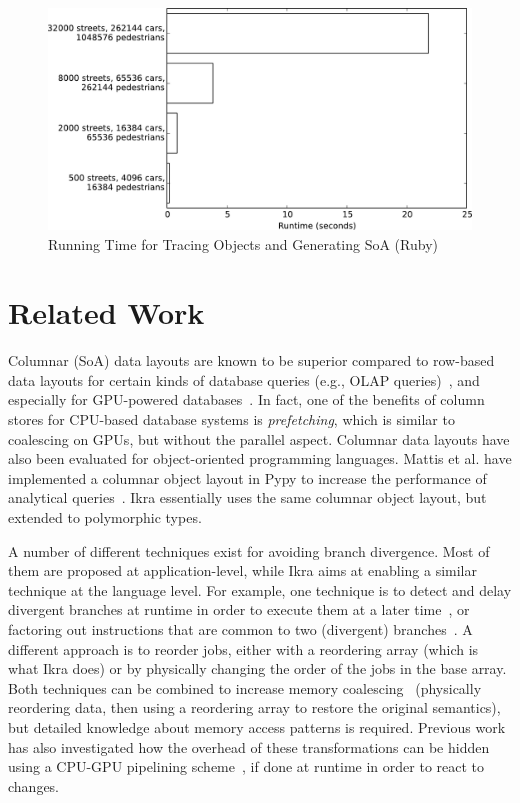 \documentclass[preprint]{sigplanconf}
\begin{document}
\begin{figure}[!htp]
    \includegraphics[width=\columnwidth]{obj_tracer.pdf}
    \centering
    \caption{Running Time for Tracing Objects and Generating SoA (Ruby)}
    \label{fig:tracing}
\end{figure}

\section{Related Work}
Columnar (SoA) data layouts are known to be superior compared to row-based data layouts for certain kinds of database queries (e.g., OLAP queries)~\cite{Plattner:2009:CDA:1559845.1559846}, and especially for GPU-powered databases~\cite{Bakkum:2010:ASD:1735688.1735706}. In fact, one of the benefits of column stores for CPU-based database systems is \emph{prefetching}, which is similar to coalescing on GPUs, but without the parallel aspect. Columnar data layouts have also been evaluated for object-oriented programming languages. Mattis et al. have implemented a columnar object layout in Pypy to increase the performance of analytical queries~\cite{Mattis:2015:COI:2814228.2814230}. Ikra essentially uses the same columnar object layout, but extended to polymorphic types.

A number of different techniques exist for avoiding branch divergence. Most of them are proposed at application-level, while Ikra aims at enabling a similar technique at the language level. For example, one technique is to detect and delay divergent branches at runtime in order to execute them at a later time~\cite{88d22b7f17}, or factoring out instructions that are common to two (divergent) branches~\cite{Han:2011:RBD:1964179.1964184}. A different approach is to reorder jobs, either with a reordering array (which is what Ikra does) or by physically changing the order of the jobs in the base array. Both techniques can be combined to increase memory coalescing~\cite{Zhang:2011:OED:1950365.1950408} (physically reordering data, then using a reordering array to restore the original semantics), but detailed knowledge about memory access patterns is required. Previous work has also investigated how the overhead of these transformations can be hidden using a CPU-GPU pipelining scheme~\cite{Zhang:2010:SGA:1810085.1810104}, if done at runtime in order to react to changes.
\end{document}
